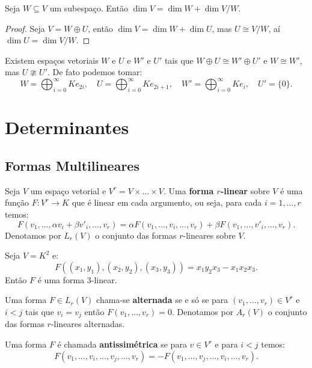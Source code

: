 \documentclass[11pt,twoside,a4paper]{book}
\begin{document}
\begin{corolario}
Seja $W\subseteq V$ um subespaço. Então $\dim V=\dim W+\dim V/W$.
\end{corolario}
\begin{proof}
Seja $V=W\oplus U$, então $\dim V=\dim W+\dim U$, mas $U\cong V/W$, aí $\dim U=\dim V/W$.
\end{proof}

\begin{observacao}
Existem espaços vetoriais $W$ e $U$ e $W'$ e $U'$ tais que $W\oplus U\cong W'\oplus U'$ e $W\cong W'$, mas $U\ncong U'$. De fato podemos tomar:
\[
W=\bigoplus_{i=0}^\infty Ke_{2i},\quad U=\bigoplus_{i=0}^\infty Ke_{2i+1},\quad W'=\bigoplus_{i=0}^\infty Ke_i,\quad U'=\{0\}.
\]
\end{observacao}

\chapter{Determinantes}

\section{Formas Multilineares}

\begin{definicao}
Seja $V$ um espaço vetorial e $V^r=V\times\dots\times V$. Uma \textbf{forma $r$-linear} sobre $V$ é uma função $F:V^r\rightarrow K$ que é linear em cada argumento, ou seja, para cada $i=1,\dots,r$ temos:
\[
F(v_1,\dots,\alpha v_i+\beta v'_i,\dots,v_r)=\alpha F(v_1,\dots,v_i,\dots,v_r)+\beta F(v_1,\dots,v'_i,\dots,v_r).
\]
Denotamos por $L_r(V)$ o conjunto das formas $r$-lineares sobre $V$.
\end{definicao}

\begin{exemplo}
Seja $V=K^2$ e:
\[
F((x_1,y_1),(x_2,y_2),(x_3,y_3))=x_1y_2x_3-x_1x_2x_3.
\]
Então $F$ é uma forma 3-linear.
\end{exemplo}

\begin{definicao}
Uma forma $F\in L_r(V)$ chama-se \textbf{alternada} se e só se para $(v_1,\dots,v_r)\in V^r$ e $i<j$ tais que $v_i=v_j$ então $F(v_1,\dots,v_r)=0$. Denotamos por $A_r(V)$ o conjunto das formas $r$-lineares alternadas.
\end{definicao}

\begin{definicao}
Uma forma $F$ é chamada \textbf{antissimétrica} se para $v\in V^r$ e para $i<j$ temos:
\[
F(v_1,\dots,v_i,\dots,v_j,\dots,v_r)=-F(v_1,\dots,v_j,\dots,v_i,\dots,v_r).
\]
\end{definicao}
\end{document}
